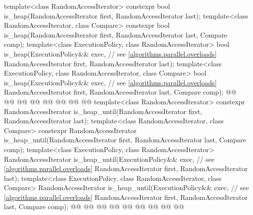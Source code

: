 \begin{codeblock}
{  template<class RandomAccessIterator>
    constexpr bool is_heap(RandomAccessIterator first, RandomAccessIterator last);
  template<class RandomAccessIterator, class Compare>
    constexpr bool is_heap(RandomAccessIterator first, RandomAccessIterator last,
                           Compare comp);
  template<class ExecutionPolicy, class RandomAccessIterator>
    bool is_heap(ExecutionPolicy&& exec, // see \ref{algorithms.parallel.overloads}
                 RandomAccessIterator first, RandomAccessIterator last);
  template<class ExecutionPolicy, class RandomAccessIterator, class Compare>
    bool is_heap(ExecutionPolicy&& exec, // see \ref{algorithms.parallel.overloads}
                 RandomAccessIterator first, RandomAccessIterator last,
                 Compare comp);
  @@
    @@
        @@
      @@
    @@
        @@
      @@
  @\added{\}}@
  template<class RandomAccessIterator>
    constexpr RandomAccessIterator
      is_heap_until(RandomAccessIterator first, RandomAccessIterator last);
  template<class RandomAccessIterator, class Compare>
    constexpr RandomAccessIterator
      is_heap_until(RandomAccessIterator first, RandomAccessIterator last,
                    Compare comp);
  template<class ExecutionPolicy, class RandomAccessIterator>
    RandomAccessIterator
      is_heap_until(ExecutionPolicy&& exec, // see \ref{algorithms.parallel.overloads}
                    RandomAccessIterator first, RandomAccessIterator last);
  template<class ExecutionPolicy, class RandomAccessIterator, class Compare>
    RandomAccessIterator
      is_heap_until(ExecutionPolicy&& exec, // see \ref{algorithms.parallel.overloads}
                    RandomAccessIterator first, RandomAccessIterator last,
                    Compare comp);
  @@
    @@
        @@
      @@
    @@
        @@
      @@
        @@
  @\added{\}}@

}
\end{codeblock}
